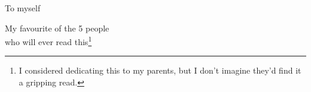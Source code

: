 \cleardoublepage
\thispagestyle{empty}
{}

\vspace*{3cm}

\begin{center}
    To myself
\end{center}

\medskip

\begin{center}
    My favourite of the 5 people\\who will ever read this\footnote{I considered dedicating this to my parents, but I don't imagine they'd find it a gripping read.}
\end{center}